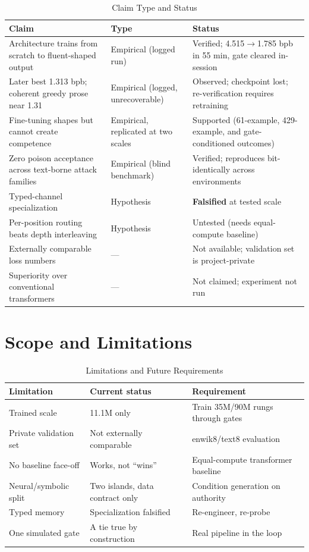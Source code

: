 \documentclass[journal]{IEEEtran}
\begin{document}
\begin{table}[!t]
\caption{Claim Type and Status}
\label{tab:claims}
\centering
\small
\begin{tabularx}{\textwidth}{lYY}
\toprule
\textbf{Claim} & \textbf{Type} & \textbf{Status} \\
\midrule
Architecture trains from scratch to fluent-shaped output & Empirical (logged run) & Verified; 4.515$\to$1.785 bpb in 55 min, gate cleared in-session \\
Later best 1.313 bpb; coherent greedy prose near 1.31 & Empirical (logged, unrecoverable) & Observed; checkpoint lost; re-verification requires retraining \\
Fine-tuning shapes but cannot create competence & Empirical, replicated at two scales & Supported (61-example, 429-example, and gate-conditioned outcomes) \\
Zero poison acceptance across text-borne attack families & Empirical (blind benchmark) & Verified; reproduces bit-identically across environments \\
Typed-channel specialization & Hypothesis & \textbf{Falsified} at tested scale \\
Per-position routing beats depth interleaving & Hypothesis & Untested (needs equal-compute baseline) \\
Externally comparable loss numbers & --- & Not available; validation set is project-private \\
Superiority over conventional transformers & --- & Not claimed; experiment not run \\
\bottomrule
\end{tabularx}
\end{table}

\section{Scope and Limitations}

\begin{table}[!t]
\caption{Limitations and Future Requirements}
\label{tab:limits}
\centering
\scriptsize
\begin{tabularx}{\columnwidth}{p{}YY}
\toprule
\textbf{Limitation} & \textbf{Current status} & \textbf{Requirement} \\
\midrule
Trained scale & 11.1M only & Train 35M/90M rungs through gates \\
Private validation set & Not externally comparable & enwik8/text8 evaluation \\
No baseline face-off & Works, not ``wins'' & Equal-compute transformer baseline \\
Neural/symbolic split & Two islands, data contract only & Condition generation on authority \\
Typed memory & Specialization falsified & Re-engineer, re-probe \\
One simulated gate & A tie true by construction & Real pipeline in the loop \\
\bottomrule
\end{tabularx}
\end{table}
\end{document}
